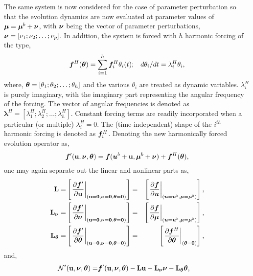 The same system is now considered for the case of parameter perturbation so that the evolution dynamics are now evaluated at parameter values of $\boldsymbol{\mu} = \boldsymbol{\mu}^{b} + \boldsymbol{\nu}$, with $\boldsymbol{\nu}$ being the vector of parameter perturbations, $\boldsymbol{\nu} = [\nu_{1};\nu_{2};\ldots;\nu_{p}]$. In addition, the system is forced with $h$ harmonic forcing of the type,
\begin{align}
	\label{eqn:harmonic_forcing}
	\boldsymbol{f}^{H}(\boldsymbol{\theta}) =\sum_{i=1}^{h}\boldsymbol{f}^{H}_{i}\theta_{i}(t); && d \theta_{i}/d t = \lambda^{H}_{i}\theta_{i},
\end{align}
where, $\boldsymbol{\theta} = [\theta_{1};\theta_{2};\ldots;\theta_{h}]$ and the various $\theta_{i}$ are treated as dynamic variables. $\lambda^{H}_{i}$ is purely imaginary, with the imaginary part representing the angular frequency of the forcing. The vector of angular frequencies is denoted as $\boldsymbol{\lambda}^{H} = [\lambda^{H}_{1};\lambda^{H}_{2};\ldots;\lambda^{H}_{h}]$. Constant forcing terms are readily incorporated when a particular (or multiple) $\lambda^{H}_{i}=0$. 
The (time-independent) shape of the $i^{th}$ harmonic forcing is denoted as $\boldsymbol{f}^{H}_{i}$.
Denoting the new harmonically forced evolution operator as,
\begin{align}
	\boldsymbol{f}'(\mathbf{u},\boldsymbol{\nu},\boldsymbol{\theta}) =  \boldsymbol{f}(\boldsymbol{u}^{b} + \mathbf{u} ,\boldsymbol{\mu}^{b} + \boldsymbol{\nu}) + \boldsymbol{f}^{H}(\boldsymbol{\theta}),
\end{align}
one may again separate out the linear and nonlinear parts as,
\begin{align}
	\mathbf{L} =& \left[\left.\dfrac{\partial \boldsymbol{f}'}{\partial \mathbf{u}}\right|_{(\mathbf{u}=\mathbf{0},\boldsymbol{\nu}=\mathbf{0},\boldsymbol{\theta}=\mathbf{0})}\right] =& \left[\left.\dfrac{\partial \boldsymbol{f}}{\partial \boldsymbol{u}}\right|_{(\boldsymbol{u}=\boldsymbol{u}^{b},\boldsymbol{\mu}=\boldsymbol{\mu}^{b})}\right], \nonumber \\
	\mathbf{L}_{\boldsymbol{\nu}} =& \left[\left.\frac{\partial \boldsymbol{f}'}{\partial \boldsymbol{\nu}}\right|_{(\mathbf{u}=\mathbf{0},\boldsymbol{\nu}=\mathbf{0},\boldsymbol{\theta}=\mathbf{0})}\right] =&
	 \left[\left.\frac{\partial \boldsymbol{f}}{\partial \boldsymbol{\mu}}\right|_{(\boldsymbol{u}=\boldsymbol{u}^{b},\boldsymbol{\mu}=\boldsymbol{\mu}^{b})}\right], \nonumber \\
	 \mathbf{L}_{\boldsymbol{\theta}} =& \left[\left.\frac{\partial \boldsymbol{f}'}{\partial \boldsymbol{\theta}}\right|_{(\mathbf{u}=\mathbf{0},\boldsymbol{\nu}=\mathbf{0},\boldsymbol{\theta}=\mathbf{0})}\right] =&
	 \left[\left.\frac{\partial \boldsymbol{f}^{H}}{\partial \boldsymbol{\theta}}\right|_{(\boldsymbol{\theta}=\mathbf{0})}\right] \nonumber,
\end{align}
and,
\begin{align}
	 \mathcal{N}'(\mathbf{u},\boldsymbol{\nu},\boldsymbol{\theta}) =& \boldsymbol{f}'(\mathbf{u},\boldsymbol{\nu},\boldsymbol{\theta}) - \mathbf{L}\mathbf{u} - \mathbf{L}_{\boldsymbol{\nu}}\boldsymbol{\nu} - \mathbf{L}_{\boldsymbol{\theta}}\boldsymbol{\theta}, \nonumber
\end{align}
